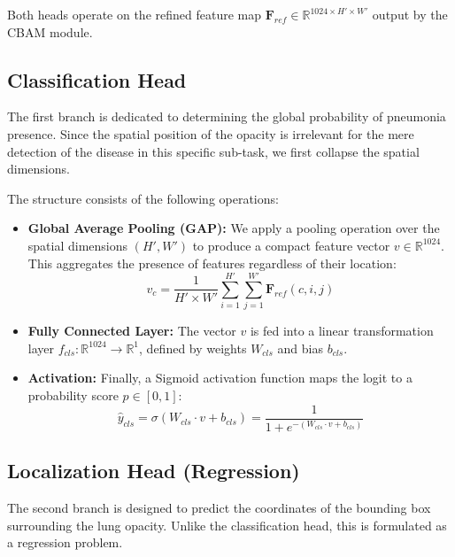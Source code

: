 \documentclass[a4paper,fleqn]{cas-dc}
\begin{document}
Both heads operate on the refined feature map $\mathbf{F}_{ref} \in \mathbb{R}^{1024 \times H' \times W'}$ output by the CBAM module.

\subsection{Classification Head}
The first branch is dedicated to determining the global probability of pneumonia presence. Since the spatial position of the opacity is irrelevant for the mere detection of the disease in this specific sub-task, we first collapse the spatial dimensions.

The structure consists of the following operations:
\begin{itemize}
	\item \textbf{Global Average Pooling (GAP):} We apply a pooling operation over the spatial dimensions $(H', W')$ to produce a compact feature vector $v \in \mathbb{R}^{1024}$. This aggregates the presence of features regardless of their location:
	\begin{equation}
		v_c = \frac{1}{H' \times W'} \sum_{i=1}^{H'} \sum_{j=1}^{W'} \mathbf{F}_{ref}(c, i, j)
	\end{equation}
	\item \textbf{Fully Connected Layer:} The vector $v$ is fed into a linear transformation layer $f_{cls}: \mathbb{R}^{1024} \to \mathbb{R}^1$, defined by weights $W_{cls}$ and bias $b_{cls}$.
	\item \textbf{Activation:} Finally, a Sigmoid activation function maps the logit to a probability score $p \in [0, 1]$:
	\begin{equation}
		\hat{y}_{cls} = \sigma(W_{cls} \cdot v + b_{cls}) = \frac{1}{1 + e^{-(W_{cls} \cdot v + b_{cls})}}
	\end{equation}
\end{itemize}

\subsection{Localization Head (Regression)}
The second branch is designed to predict the coordinates of the bounding box surrounding the lung opacity. Unlike the classification head, this is formulated as a regression problem.
\end{document}
